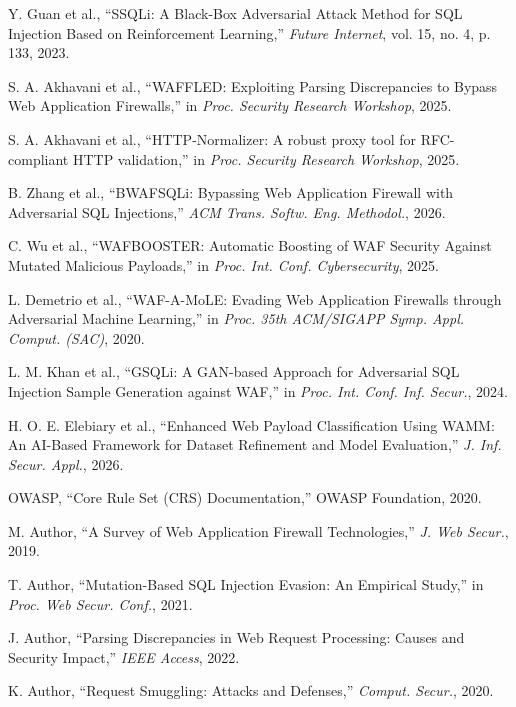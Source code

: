 Y. Guan et al., ``SSQLi: A Black-Box Adversarial Attack Method for SQL Injection Based on Reinforcement Learning,'' \emph{Future Internet}, vol. 15, no. 4, p. 133, 2023.

S. A. Akhavani et al., ``WAFFLED: Exploiting Parsing Discrepancies to Bypass Web Application Firewalls,'' in \emph{Proc. Security Research Workshop}, 2025.

S. A. Akhavani et al., ``HTTP-Normalizer: A robust proxy tool for RFC-compliant HTTP validation,'' in \emph{Proc. Security Research Workshop}, 2025.

B. Zhang et al., ``BWAFSQLi: Bypassing Web Application Firewall with Adversarial SQL Injections,'' \emph{ACM Trans. Softw. Eng. Methodol.}, 2026.

C. Wu et al., ``WAFBOOSTER: Automatic Boosting of WAF Security Against Mutated Malicious Payloads,'' in \emph{Proc. Int. Conf. Cybersecurity}, 2025.

L. Demetrio et al., ``WAF-A-MoLE: Evading Web Application Firewalls through Adversarial Machine Learning,'' in \emph{Proc. 35th ACM/SIGAPP Symp. Appl. Comput. (SAC)}, 2020.

L. M. Khan et al., ``GSQLi: A GAN-based Approach for Adversarial SQL Injection Sample Generation against WAF,'' in \emph{Proc. Int. Conf. Inf. Secur.}, 2024.

H. O. E. Elebiary et al., ``Enhanced Web Payload Classification Using WAMM: An AI-Based Framework for Dataset Refinement and Model Evaluation,'' \emph{J. Inf. Secur. Appl.}, 2026.

OWASP, ``Core Rule Set (CRS) Documentation,'' OWASP Foundation, 2020.

M. Author, ``A Survey of Web Application Firewall Technologies,'' \emph{J. Web Secur.}, 2019.

T. Author, ``Mutation-Based SQL Injection Evasion: An Empirical Study,'' in \emph{Proc. Web Secur. Conf.}, 2021.

J. Author, ``Parsing Discrepancies in Web Request Processing: Causes and Security Impact,'' \emph{IEEE Access}, 2022.

K. Author, ``Request Smuggling: Attacks and Defenses,'' \emph{Comput. Secur.}, 2020.

